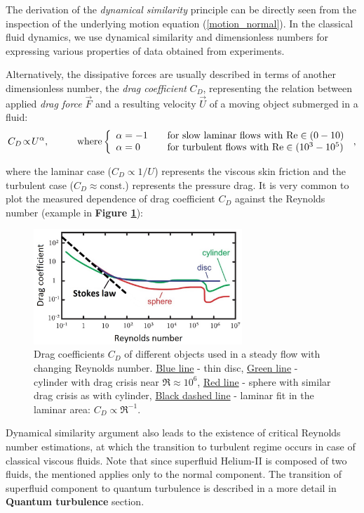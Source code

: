 The derivation of the \textit{dynamical similarity} principle can be directly seen from the inspection of the underlying motion equation (\ref{motion_normal}). In the classical fluid dynamics, we use dynamical similarity and dimensionless numbers for expressing various properties of data obtained from experiments.

Alternatively, the dissipative forces are usually described in terms of another  dimensionless number, the \textit{drag coefficient} $C_D$, representing the relation between applied \textit{drag force} $\vec{F}$ and a resulting velocity $\vec{U}$ of a moving object submerged in a fluid:
$$
C_D \!\propto\! U^\alpha, \hspace{1cm}
\text{where}
\left\{
  \begin{array}{l l}
    \alpha=-1 & \quad \text{for slow laminar flows with $\Re \in (0-10)$}\\
    \alpha=0 & \quad \text{for turbulent flows with $\Re \in (10^3-10^5)$}
  \end{array}
\right.\,,
$$

where the laminar case ($C_D \propto 1/U$) represents the viscous skin friction and the turbulent case ($C_D \approx \text{const.}$) represents the pressure drag. It is very common to plot the measured dependence of drag coefficient $C_D$ against the Reynolds number (example in \textbf{Figure \ref{C-Re}}):

\begin{figure}[h]
	\centering
	\includegraphics[width=0.7\textwidth]{graphics/theory/C-Re}
	\caption{Drag coefficients $C_D$ of different objects used in a steady flow with changing Reynolds number. \underline{Blue line} - thin disc, \underline{Green line} - cylinder with drag crisis near $\Re \approx 10^6$, \underline{Red line} - sphere with similar drag crisis as with cylinder, \underline{Black dashed line} - laminar fit in the laminar area: $C_D \propto \Re^{-1}$.}
	\label{C-Re}
\end{figure}

Dynamical similarity argument also leads to the existence of critical Reynolds number estimations, at which the transition to turbulent regime occurs in case of classical viscous fluids. Note that since superfluid Helium-II is composed of two fluids, the mentioned applies only to the normal component. The transition of superfluid component to quantum turbulence is described in a more detail in \textbf{Quantum turbulence} section.

